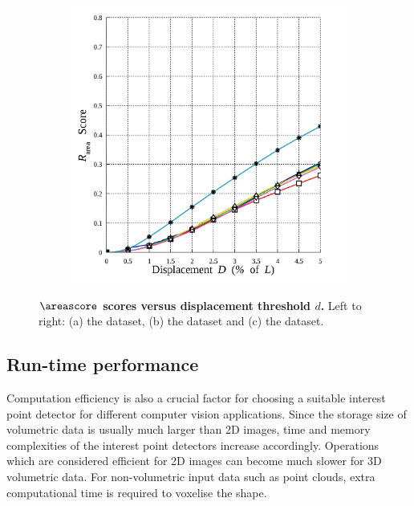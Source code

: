 \begin{figure}[ht]
\begin{subfigure}[t]{0.49\linewidth}
		\label{fig/eval/graph_mri}
	\end{subfigure}
	\begin{subfigure}[t]{0.49\linewidth}
		\centering 
		\includegraphics[width=0.95\linewidth]{./fig/eval/graph_stereo.jpg}
		\label{fig/eval/graph_mvs}
	\end{subfigure}
	\caption{\textbf{$\areascore$ scores versus displacement threshold $d$.} Left to right: (a) the \meshset dataset, (b) the \mriset dataset and (c) the \stereoset dataset.}
\label{fig/eval/graph2}
\end{figure}

\subsection{Run-time performance}

Computation efficiency is also a crucial factor for choosing a suitable interest point detector for different computer vision applications. Since the storage size of volumetric data is usually much larger than 2D images, time and memory complexities of the interest point detectors increase accordingly. Operations which are considered efficient for 2D images can become much slower for 3D volumetric data. For non-volumetric input data such as point clouds, extra computational time is required to voxelise the shape. 

